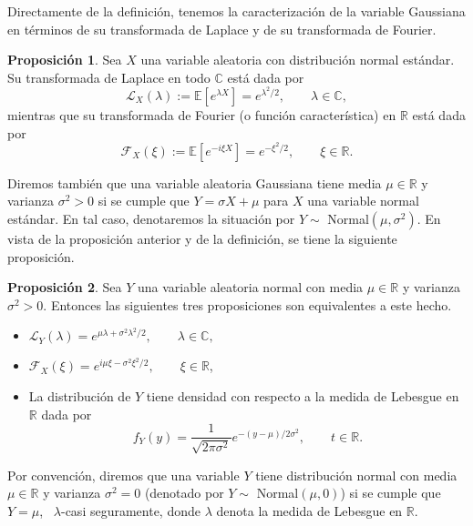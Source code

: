 \documentclass[letterpaper,twoside,12pt]{book}
\newcommand{\R}{\mathbb{R}}
\newcommand{\C}{\mathbb{C}}
\newcommand{\F}{\mathcal{F}}
\newcommand{\E}{\mathbb{E}}
\newcommand{\1}{\mathds{1}}
\theoremstyle{definition}
\theoremstyle{definition}
\theoremstyle{definition}
\theoremstyle{definition}
\newtheorem{prop}{Proposición}
\theoremstyle{definition}
\theoremstyle{definition}
\theoremstyle{definition}
\begin{document}
Directamente de la definición, tenemos la caracterización de la variable Gaussiana en términos de su transformada de Laplace y de su transformada de Fourier.
\begin{prop} 
 Sea $X$ una variable aleatoria con distribución normal estándar. Su transformada de Laplace en todo $\C$ está dada por 
 \[
 \mathcal{L}_X(\lambda):=\E\left[e^{\lambda X}\right]=e^{\lambda^2/2}, \qquad \lambda\in \C,
 \]
mientras que su transformada de Fourier (o función característica) en $\R$ está dada por 
\[
\mathcal{F}_X(\xi):=\E\left[e^{-i\xi X}\right]=e^{-\xi^2/2}, \qquad \xi \in \R. 
\]
 \end{prop}

Diremos también que una variable aleatoria Gaussiana tiene media $\mu\in \R$ y varianza $\sigma^2>0$ si se cumple que $Y=\sigma X+\mu$ para $X$ una variable normal estándar. En tal caso, denotaremos la situación por $Y\sim$ Normal$(\mu,\sigma^2)$. En vista de la proposición anterior y de la definición, se tiene la siguiente proposición.
\begin{prop} 
 Sea $Y$ una variable aleatoria normal con media $\mu\in \R$ y varianza $\sigma^2>0$. Entonces las siguientes tres proposiciones son equivalentes a este hecho.
 \begin{itemize}
    \item $\mathcal{L}_Y(\lambda)=e^{\mu\lambda+\sigma^2\lambda^2/2}, \qquad \lambda \in \C,$
    \item $\F_X(\xi)=e^{i\mu\xi-\sigma^2\xi^2/2}, \qquad \xi \in \R$,
    \item La distribución de $Y$ tiene densidad con respecto a la medida de Lebesgue en $\R$ dada por 
    \[
        f_Y(y)=\frac{1}{\sqrt{2\pi\sigma^2}}e^{-(y-\mu)/2\sigma^2}, \qquad t\in \R.    
    \]
 \end{itemize}
 \end{prop}
 Por convención, diremos que una variable $Y$ tiene distribución normal con media $\mu\in \R$ y varianza $\sigma^2=0$ (denotado por $Y\sim$ Normal$(\mu,0)$) si se cumple que $Y=\mu$, \  $\lambda$-casi seguramente, donde $\lambda$ denota la medida de Lebesgue en $\R$.
\end{document}
